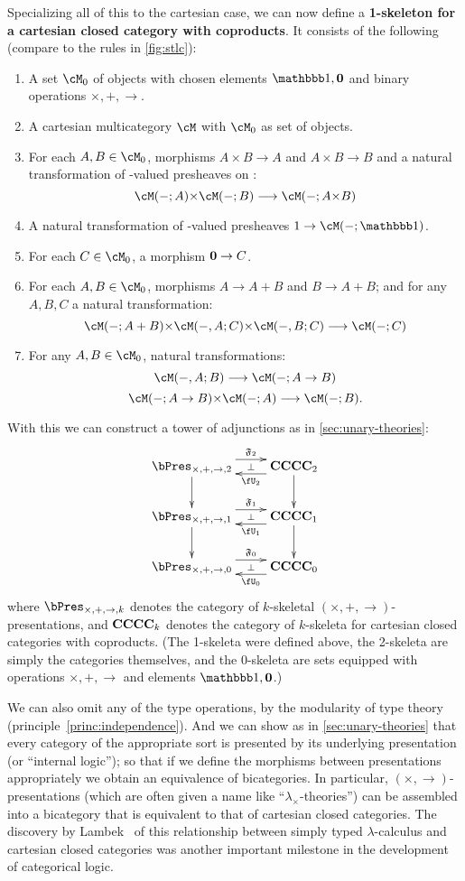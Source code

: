 Specializing all of this to the cartesian case, we can now define a \textbf{1-skeleton for a cartesian closed category with coproducts}.
It consists of the following (compare to the rules in \cref{fig:stlc}):
\begin{enumerate}
\item A set $\cM_0$ of objects with chosen elements $\unit,\zero$ and binary operations $\times,+,\to$.
\item A cartesian multicategory $\cM$ with $\cM_0$ as set of objects.
\item For each $A,B\in\cM_0$, morphisms $A\times B\to A$ and $A\times B\to B$ and a natural transformation of \bSet-valued presheaves on \cM:
  \[ \cM(-;A) \times \cM(-;B)\too \cM(-;A\times B) \]
\item A natural transformation of \bSet-valued presheaves $1\to \cM(-;\unit)$.
\item For each $C\in\cM_0$, a morphism $\mathbf{0}\to C$.
\item For each $A,B\in\cM_0$, morphisms $A\to A+B$ and $B\to A+B$; and for any $A,B,C$ a natural transformation:
  \[ \cM(-;A+B) \times \cM(-,A;C) \times \cM(-,B;C) \too \cM(-;C) \]
\item For any $A,B\in \cM_0$, natural transformations:
  \[ \cM(-,A;B) \too \cM(-;A\to B) \]
  \[ \cM(-;A\to B) \times \cM(-;A) \too \cM(-;B). \]
\end{enumerate}
With this we can construct a tower of adjunctions as in \cref{sec:unary-theories}:
\[ \xymatrix{
  \stlcpres 2 \ar@<2mm>[r]^-{\F{2}} \ar@{}[r]|-{\bot} \ar[d] & \cccc 2 \ar@<2mm>[l]^-{\fU_2} \ar[d] \\
  \stlcpres 1 \ar@<2mm>[r]^-{\F{1}} \ar@{}[r]|-{\bot} \ar[d] & \cccc 1 \ar@<2mm>[l]^-{\fU_1} \ar[d] \\
  \stlcpres 0 \ar@<2mm>[r]^-{\F{0}} \ar@{}[r]|-{\bot}        & \cccc 0 \ar@<2mm>[l]^-{\fU_0}
}\]
where $\stlcpres k$ denotes the category of $k$-skeletal $(\times,+,\to)$-presentations, and $\mathbf{CCCC}_{k}$ denotes the category of $k$-skeleta for cartesian closed categories with coproducts.
(The 1-skeleta were defined above, the 2-skeleta are simply the categories themselves, and the 0-skeleta are sets equipped with operations $\times,+,\to$ and elements $\unit,\zero$.)

We can also omit any of the type operations, by the modularity of type theory (principle~\eqref{princ:independence}).
And we can show as in \cref{sec:unary-theories} that every category of the appropriate sort is presented by its underlying presentation (or ``internal logic''); so that if we define the morphisms between presentations appropriately we obtain an equivalence of bicategories.
In particular, $(\times,\to)$-presentations (which are often given a name like ``$\lambda_\times$-theories'') can be assembled into a bicategory that is equivalent to that of cartesian closed categories.
The discovery by Lambek~\cite{lambek:stlc-ccc} of this relationship between simply typed $\lambda$-calculus and cartesian closed categories was another important milestone in the development of categorical logic.


